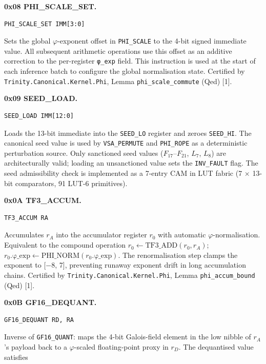 \textbf{0x08 PHI\_SCALE\_SET.}

\begin{verbatim}
PHI_SCALE_SET IMM[3:0]
\end{verbatim}

Sets the global \(\varphi\)-exponent offset in
\texttt{PHI\_SCALE} to the 4-bit signed immediate
value. All subsequent arithmetic operations use this
offset as an additive correction to the per-register
\texttt{φ\_exp} field. This instruction is used at
the start of each inference batch to configure the
global normalisation state. Certified by
\texttt{Trinity.Canonical.Kernel.Phi}, Lemma
\texttt{phi\_scale\_commute} (Qed) [1].

\textbf{0x09 SEED\_LOAD.}

\begin{verbatim}
SEED_LOAD IMM[12:0]
\end{verbatim}

Loads the 13-bit immediate into the
\texttt{SEED\_LO} register and zeroes
\texttt{SEED\_HI}. The canonical seed value is
used by \texttt{VSA\_PERMUTE} and
\texttt{PHI\_ROPE} as a deterministic perturbation
source. Only sanctioned seed values
(\(F_{17}\)--\(F_{21}\), \(L_7\), \(L_8\)) are
architecturally valid; loading an unsanctioned value
sets the \texttt{INV\_FAULT} flag. The seed
admissibility check is implemented as a 7-entry CAM
in LUT fabric (7 \(\times\) 13-bit comparators,
91 LUT-6 primitives).

\textbf{0x0A TF3\_ACCUM.}

\begin{verbatim}
TF3_ACCUM RA
\end{verbatim}

Accumulates \(r_A\) into the accumulator register
\(r_0\) with automatic \(\varphi\)-normalisation.
Equivalent to the compound operation
\(r_0 \leftarrow \text{TF3\_ADD}(r_0, r_A)\);
\(r_0.\text{φ\_exp} \leftarrow
\text{PHI\_NORM}(r_0.\text{φ\_exp})\). The
renormalisation step clamps the exponent to
{[}−8, 7{]}, preventing runaway exponent drift in
long accumulation chains. Certified by
\texttt{Trinity.Canonical.Kernel.Phi}, Lemma
\texttt{phi\_accum\_bound} (Qed) [1].

\textbf{0x0B GF16\_DEQUANT.}

\begin{verbatim}
GF16_DEQUANT RD, RA
\end{verbatim}

Inverse of \texttt{GF16\_QUANT}: maps the 4-bit
Galois-field element in the low nibble of
\(r_A\)'s payload back to a \(\varphi\)-scaled
floating-point proxy in \(r_D\). The dequantised
value satisfies

